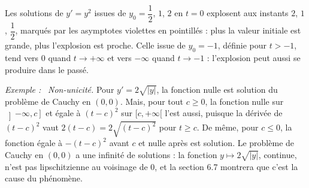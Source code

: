 \documentclass[a4paper,twoside]{report}
\newenvironment{exemple}%
 {\par\needspace{6\baselineskip}\vspace{1mm}\begin{list}{}{\leftmargin=1cm \rightmargin=0.5cm}\item[]%
  \textit{Exemple :}~}%
 {\end{list}\vspace{1mm}}
\begin{document}
\noindent Les solutions de $y' = y^{2}$ issues de $y_{0} = \dfrac{1}{2}$, $1$, $2$ en $t = 0$ explosent aux instants $2$, $1$, $\dfrac{1}{2}$, marqués par les asymptotes violettes en pointillés : plus la valeur initiale est grande, plus l'explosion est proche. Celle issue de $y_{0} = -1$, définie pour $t > -1$, tend vers $0$ quand $t \to +\infty$ et vers $-\infty$ quand $t \to -1$ : l'explosion peut aussi se produire dans le passé.

\begin{exemple}
\emph{Non-unicité.} Pour $y' = 2\sqrt{|y|}$, la fonction nulle est solution du problème de Cauchy en $(0, 0)$. Mais, pour tout $c \geqslant 0$, la fonction nulle sur $\left]-\infty, c\right]$ et égale à $(t - c)^{2}$ sur $[c, +\infty[$ l'est aussi, puisque la dérivée de $(t - c)^{2}$ vaut $2(t - c) = 2\sqrt{(t - c)^{2}}$ pour $t \geqslant c$. De même, pour $c \leqslant 0$, la fonction égale à $-(t - c)^{2}$ avant $c$ et nulle après est solution. Le problème de Cauchy en $(0, 0)$ a une infinité de solutions : la fonction $y \mapsto 2\sqrt{|y|}$, continue, n'est pas lipschitzienne au voisinage de $0$, et la section 6.7 montrera que c'est la cause du phénomène.
\end{exemple}

\begin{center}
\end{center}
\end{document}
